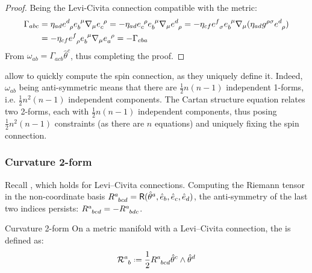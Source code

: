 \begin{proofbox}
  \begin{proof}
    Being the Levi-Civita connection compatible with the metric:
    \begin{equation*}
      \begin{split}
        \Gamma_{abc}
        &= \eta_{ad} \tensor{e}{^d_\rho} \tensor{e}{_b^\mu} \na_\mu \tensor{e}{_c^\rho} = -\eta_{ad} \tensor{e}{_c^\rho} \tensor{e}{_b^\mu} \na_\mu \tensor{e}{^d_\rho} = -\eta_{cf} \tensor{e}{^f_\sigma} \tensor{e}{_b^\mu} \na_\mu (\eta_{ad} g^{\rho \sigma} \tensor{e}{^d_\rho}) \\
        &= -\eta_{cf} \tensor{e}{^f_\rho} \tensor{e}{_b^\mu} \na_\mu \tensor{e}{_a^\rho} = -\Gamma_{cba}
      \end{split}
    \end{equation*}
    From  $ \omega_{ab} = \Gamma_{acb} \hat{\theta}^c $, thus completing the proof.
  \end{proof}
\end{proofbox}

 allow to quickly compute the spin connection, as they uniquely define it. Indeed, $ \omega_{ab} $ being anti-symmetric means that there are $ \frac{1}{2} n (n-1) $ independent 1-forms, i.e. $ \frac{1}{2} n^2 (n-1) $ independent components. The Cartan structure equation relates two 2-forms, each with $ \frac{1}{2} n (n-1) $ independent components, thus posing $ \frac{1}{2} n^2 (n-1) $ constraints (as there are $ n $ equations) and uniquely fixing the spin connection.

\subsubsection{Curvature 2-form}

Recall , which holds for Levi--Civita connections. Computing the Riemann tensor in the non-coordinate basis $ \tensor{R}{^a_{bcd}} = \riem(\hat{\theta}^a, \hat{e}_b, \hat{e}_c, \hat{e}_d) $, the anti-symmetry of the last two indices persists: $ \tensor{R}{^a_{bcd}} = -\tensor{R}{^a_{bdc}} $.

\begin{definition}{Curvature 2-form}{}
  On a metric manifold with a Levi--Civita connection, the  is defined as:
  \begin{equation}
    \tensor{\mathcal{R}}{^a_b} \defeq \frac{1}{2} \tensor{R}{^a_{bcd}} \hat{\theta}^c \wedge \hat{\theta}^d
    \label{eq:curvature-2-def}
  \end{equation}
\end{definition}

